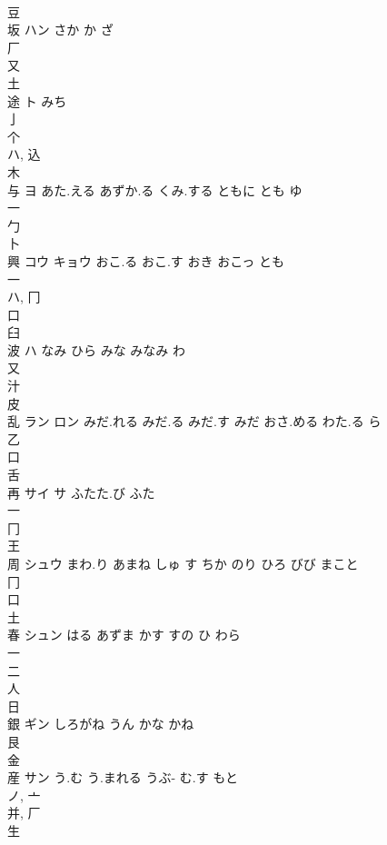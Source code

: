 \documentclass[8pt]{extreport}
\begin{document}
\begin{CJK}{UTF8}{min}
\\	豆 
\\	坂	ハン	さか か ざ	
\\	厂 
\\	又 
\\	土 
\\	途	ト	みち	
\\	亅 
\\	个 
\\	ハ, 込 
\\	木 
\\	与	ヨ	あた.える あずか.る くみ.する ともに とも ゆ	
\\	一 
\\	勹 
\\	卜 
\\	興	コウ キョウ	おこ.る おこ.す おき おこっ とも	
\\	一 
\\	ハ, 冂 
\\	口 
\\	臼 
\\	波	ハ	なみ ひら みな みなみ わ	
\\	又 
\\	汁 
\\	皮 
\\	乱	ラン ロン	みだ.れる みだ.る みだ.す みだ おさ.める わた.る ら	
\\	乙 
\\	口 
\\	舌 
\\	再	サイ サ	ふたた.び ふた	
\\	一 
\\	冂 
\\	王 
\\	周	シュウ	まわ.り あまね しゅ す ちか のり ひろ びび まこと	
\\	冂 
\\	口 
\\	土 
\\	春	シュン	はる あずま かす すの ひ わら	
\\	一 
\\	二 
\\	人 
\\	日 
\\	銀	ギン	しろがね うん かな かね	
\\	艮 
\\	金 
\\	産	サン	う.む う.まれる うぶ- む.す もと	
\\	ノ, 亠 
\\	并, 厂 
\\	生 

\end{CJK}
\end{document}
